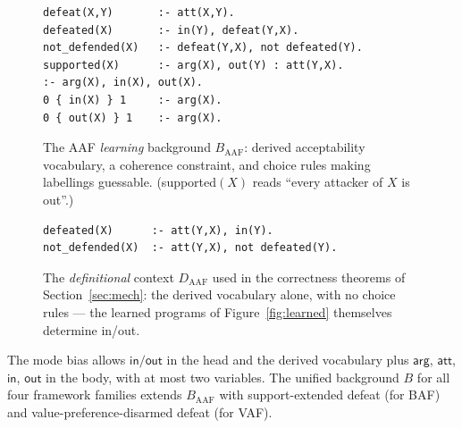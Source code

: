 \documentclass[review,12pt]{elsarticle}
\theoremstyle{definition}
\theoremstyle{remark}
\newcommand{\pred}[1]{\textsf{#1}}
\newcommand{\Daaf}{D_{\mathrm{AAF}}}
\begin{document}
\begin{figure}[t]
\centering
\small
\begin{minipage}{0.72\linewidth}
\begin{verbatim}
defeat(X,Y)       :- att(X,Y).
defeated(X)       :- in(Y), defeat(Y,X).
not_defended(X)   :- defeat(Y,X), not defeated(Y).
supported(X)      :- arg(X), out(Y) : att(Y,X).
:- arg(X), in(X), out(X).
0 { in(X) } 1     :- arg(X).
0 { out(X) } 1    :- arg(X).
\end{verbatim}
\end{minipage}
\caption{The AAF \emph{learning} background $B_{\mathrm{AAF}}$: derived
acceptability vocabulary, a coherence constraint, and choice rules making
labellings guessable. (\pred{supported}$(X)$ reads ``every attacker of $X$ is
out''.)}
\label{fig:bg}
\end{figure}

\begin{figure}[t]
\centering
\small
\begin{minipage}{0.72\linewidth}
\begin{verbatim}
defeated(X)      :- att(Y,X), in(Y).
not_defended(X)  :- att(Y,X), not defeated(Y).
\end{verbatim}
\end{minipage}
\caption{The \emph{definitional} context $\Daaf$ used in the correctness
theorems of Section~\ref{sec:mech}: the derived vocabulary alone, with no
choice rules --- the learned programs of Figure~\ref{fig:learned} themselves
determine \pred{in}/\pred{out}.}
\label{fig:defs}
\end{figure}

\noindent The mode bias allows $\pred{in}/\pred{out}$ in the head and the
derived vocabulary plus $\pred{arg}$, $\pred{att}$, $\pred{in}$, $\pred{out}$
in the body, with at most two variables. The unified background $B$ for all
four framework families extends $B_{\mathrm{AAF}}$ with support-extended defeat
(for BAF) and value-preference-disarmed defeat (for VAF).
\end{document}
